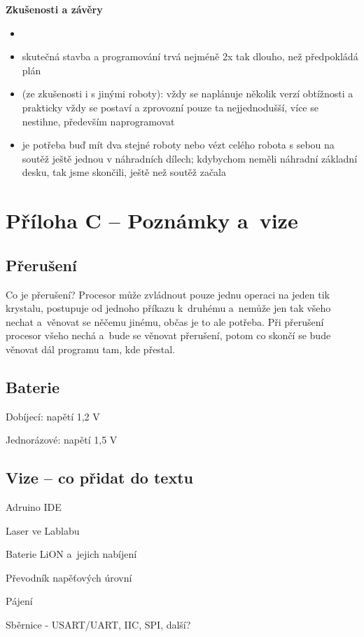 {\bf Zkušenosti a závěry}
	\begin{itemize}
		\item[]
		\item  skutečná stavba a programování trvá nejméně 2x tak dlouho, než předpokládá plán 
		\item (ze zkušenosti i s jinými roboty): vždy se naplánuje několik verzí obtížnosti a prakticky vždy se postaví a zprovozní pouze ta nejjednodušší, více se nestihne, především naprogramovat  
		\item je potřeba buď mít dva stejné roboty nebo vézt celého robota s sebou na soutěž ještě jednou v náhradních dílech; kdybychom neměli náhradní základní desku, tak jsme skončili, ještě než soutěž začala  
	\end{itemize}



\section*{Příloha C -- Poznámky a~vize}



\subsection*{Přerušení}

Co je přerušení? Procesor může zvládnout pouze jednu operaci na jeden tik krystalu, 
postupuje od jednoho příkazu k~druhému a~nemůže jen tak všeho nechat a~věnovat se něčemu jinému, občas je to ale potřeba.
 Při přerušení procesor všeho nechá a~bude se věnovat přerušení, potom co skončí se bude věnovat dál programu tam, kde přestal. 

\subsection*{Baterie}

Dobíjecí: napětí 1,2 V~

Jednorázové: napětí 1,5 V~
 

\subsection*{Vize -- co přidat do textu}

Adruino IDE 

Laser ve Lablabu 

Baterie LiON a~jejich nabíjení 

Převodník napěťových úrovní 

Pájení 

Sběrnice - USART/UART, IIC, SPI, další?






